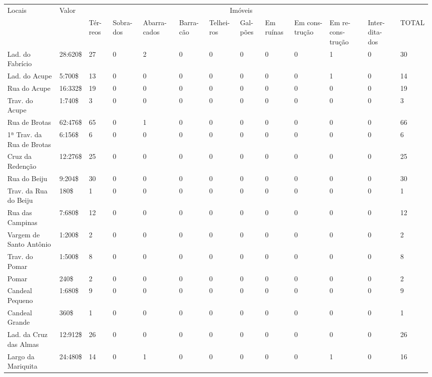 \begin{table}[!htp]
{
\begin{tiny}
\begin{tabular}{m{3cm} m{1cm} m{} m{} m{} m{} m{} m{} m{} m{} m{} m{} m{}}
\hline
\multirow{2}{*}{Locais}	& \multirow{2}{*}{Valor}	& \multicolumn{10}{c}{Imóveis}\\
\cline{3-13}
	&	&Tér- reos	&Sobra- dos	&Abarra- cados	&Barra- cão	&Telhei- ros	&Gal- pões	&Em ruínas	&Em cons- trução	&Em re- cons- trução	&Inter- dita- dos	&TOTAL\\
\hline
\hline
Lad. do Fabrício						&28:620\$	&27	&0	&2	&0	&0	&0	&0	&0	&1	&0	&30\\
Lad. do Acupe						&5:700\$	&13	&0	&0	&0	&0	&0	&0	&0	&1	&0	&14\\
Rua do Acupe							&16:332\$	&19	&0	&0	&0	&0	&0	&0	&0	&0	&0	&19\\
Trav. do Acupe						&1:740\$	&3	&0	&0	&0	&0	&0	&0	&0	&0	&0	&3\\
Rua de Brotas							&62:476\$	&65	&0	&1	&0	&0	&0	&0	&0	&0	&0	&66\\
1ª Trav. da Rua de Brotas					&6:156\$	&6	&0	&0	&0	&0	&0	&0	&0	&0	&0	&6\\
Cruz da Redenção						&12:276\$	&25	&0	&0	&0	&0	&0	&0	&0	&0	&0	&25\\
Rua do Beiju							&9:204\$	&30	&0	&0	&0	&0	&0	&0	&0	&0	&0	&30\\
Trav. da Rua do Beiju					&180\$		&1	&0	&0	&0	&0	&0	&0	&0	&0	&0	&1\\
Rua das Campinas						&7:680\$	&12	&0	&0	&0	&0	&0	&0	&0	&0	&0	&12\\
Vargem de Santo Antônio						&1:200\$	&2	&0	&0	&0	&0	&0	&0	&0	&0	&0	&2\\
Trav. do Pomar						&1:500\$	&8	&0	&0	&0	&0	&0	&0	&0	&0	&0	&8\\
Pomar								&240\$		&2	&0	&0	&0	&0	&0	&0	&0	&0	&0	&2\\
Candeal Pequeno							&1:680\$	&9	&0	&0	&0	&0	&0	&0	&0	&0	&0	&9\\
Candeal Grande							&360\$		&1	&0	&0	&0	&0	&0	&0	&0	&0	&0	&1\\
Lad. da Cruz das Almas					&12:912\$	&26	&0	&0	&0	&0	&0	&0	&0	&0	&0	&26\\
Largo da Mariquita						&24:480\$	&14	&0	&1	&0	&0	&0	&0	&0	&1	&0	&16\\

\end{tabular}
\end{tiny}}
\end{table}
